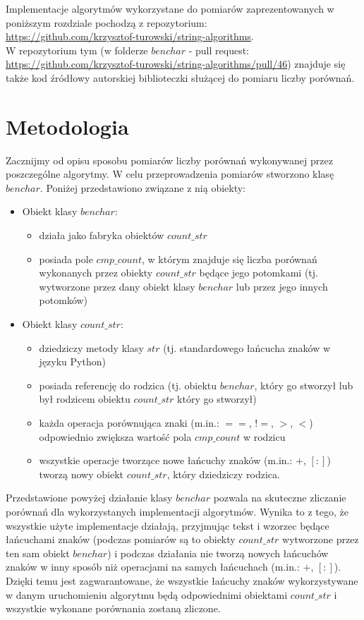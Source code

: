 Implementacje algorytmów wykorzystane do pomiarów zaprezentowanych w poniższym rozdziale pochodzą z repozytorium: \\
\url{https://github.com/krzysztof-turowski/string-algorithms}. \\
W repozytorium tym (w folderze $benchar$ - pull request: \url{https://github.com/krzysztof-turowski/string-algorithms/pull/46}) znajduje się także kod źródłowy autorskiej biblioteczki służącej do pomiaru liczby porównań.

\section{Metodologia}
Zacznijmy od opisu sposobu pomiarów liczby porównań wykonywanej przez poszczególne algorytmy. W celu przeprowadzenia pomiarów stworzono klasę $benchar$. Poniżej przedstawiono związane z nią obiekty:
\begin{itemize}
    \item Obiekt klasy $benchar$:
    \begin{itemize}
        \item działa jako fabryka obiektów $count\_str$
        \item posiada pole $cmp\_count$, w którym znajduje się liczba porównań wykonanych przez obiekty $count\_str$ będące jego potomkami (tj. wytworzone przez dany obiekt klasy $benchar$ lub przez jego innych potomków)
    \end{itemize}
    \item Obiekt klasy $count\_str$:
    \begin{itemize}
        \item dziedziczy metody klasy $str$ (tj. standardowego łańcucha znaków w języku Python)
        \item posiada referencję do rodzica (tj. obiektu $benchar$, który go stworzył lub był rodzicem obiektu $count\_str$ który go stworzył)
        \item każda operacja porównująca znaki (m.in.: $==$, $!=$, $>$, $<$) odpowiednio zwiększa wartość pola $cmp\_count$ w rodzicu
        \item wszystkie operacje tworzące nowe łańcuchy znaków (m.in.: $+$, $[:]$) tworzą nowy obiekt $count\_str$, który dziedziczy rodzica.
    \end{itemize}
\end{itemize}

Przedstawione powyżej działanie klasy $benchar$ pozwala na skuteczne zliczanie porównań dla wykorzystanych implementacji algorytmów. Wynika to z tego, że wszystkie użyte implementacje działają, przyjmując tekst i wzorzec będące łańcuchami znaków (podczas pomiarów są to obiekty $count\_str$ wytworzone przez ten sam obiekt $benchar$) i podczas działania nie tworzą nowych łańcuchów znaków w inny sposób niż operacjami na samych łańcuchach (m.in.: $+$, $[:]$). Dzięki temu jest zagwarantowane, że wszystkie łańcuchy znaków wykorzystywane w danym uruchomieniu algorytmu będą odpowiednimi obiektami $count\_str$ i wszystkie wykonane porównania zostaną zliczone.

